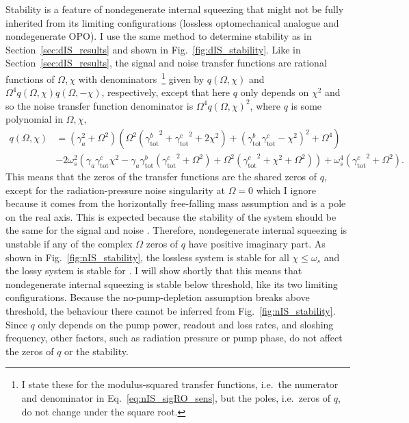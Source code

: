 Stability is a feature of nondegenerate internal squeezing that might not be fully inherited from its limiting configurations (lossless optomechanical analogue and nondegenerate OPO). I use the same method to determine stability as in Section~\ref{sec:dIS_results} and shown in Fig.~\ref{fig:dIS_stability}. Like in Section~\ref{sec:dIS_results}, the signal and noise transfer functions are rational functions of $\Omega, \chi$ with denominators~\footnote{I state these for the modulus-squared transfer functions, i.e.\ the numerator and denominator in Eq.~\ref{eq:nIS_sigRO_sens}, but the poles, i.e.\ zeros of $q$, do not change under the square root.} given by $q(\Omega,\chi)$ and $\Omega^4 q(\Omega,\chi) q(\Omega,-\chi)$, respectively, except that here $q$ only depends on $\chi^2$ and so the noise transfer function denominator is $\Omega^4 q(\Omega,\chi)^2$, where $q$ is some polynomial in $\Omega, \chi$, 
\begin{align}
q(\Omega,\chi)&=\left(\gamma_a^2+\Omega ^2\right) \left(\Omega ^2 \left({\gamma^b_\text{tot}}^2+{\gamma^c_\text{tot}}^2+2 \chi ^2\right)+\left({\gamma^b_\text{tot}} {\gamma^c_\text{tot}}-\chi ^2\right)^2+\Omega ^4\right)\\
&-2 \omega_s^2 \left(\gamma_a {\gamma^c_\text{tot}} \chi ^2-\gamma_a {\gamma^b_\text{tot}} \left({\gamma^c_\text{tot}}^2+\Omega ^2\right)+\Omega ^2 \left({\gamma^c_\text{tot}}^2+\chi ^2+\Omega ^2\right)\right)+\omega_s^4 \left({\gamma^c_\text{tot}}^2+\Omega ^2\right).
\end{align}
This means that the zeros of the transfer functions are the shared zeros of $q$, except for the radiation-pressure noise singularity at $\Omega=0$ which I ignore because it comes from the horizontally free-falling mass assumption and is a pole on the real axis. This is expected because the stability of the system should be the same for the signal and noise .
Therefore, nondegenerate internal squeezing is unstable if any of the complex $\Omega$ zeros of $q$ have positive imaginary part. As shown in Fig.~\ref{fig:nIS_stability}, the lossless system is stable for all $\chi\leq\omega_s$ and the lossy system is stable for . I will show shortly that this means that nondegenerate internal squeezing is stable below threshold, like its two limiting configurations. Because the no-pump-depletion assumption breaks above threshold, the behaviour there cannot be inferred from Fig.~\ref{fig:nIS_stability}.
Since $q$ only depends on the pump power, readout and loss rates, and sloshing frequency, other factors, such as radiation pressure or pump phase, do not affect the zeros of $q$ or the stability.


